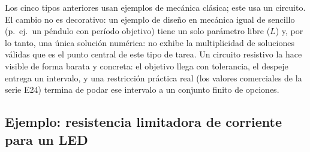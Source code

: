 \documentclass[11pt]{book}
\begin{document}
\medskip
{} Los cinco tipos anteriores usan ejemplos de mecánica clásica; este usa un circuito. El cambio no es decorativo: un ejemplo de diseño en mecánica igual de sencillo (p.\ ej.\ un péndulo con período objetivo) tiene un solo parámetro libre ($L$) y, por lo tanto, una única solución numérica: no exhibe la multiplicidad de soluciones válidas que es el punto central de este tipo de tarea. Un circuito resistivo la hace visible de forma barata y concreta: el objetivo llega con tolerancia, el despeje entrega un intervalo, y una restricción práctica real (los valores comerciales de la serie E24) termina de podar ese intervalo a un conjunto finito de opciones.

\subsection*{Ejemplo: resistencia limitadora de corriente para un LED}
\end{document}
